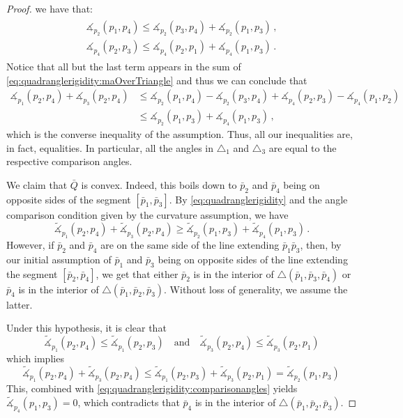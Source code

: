 \documentclass[11pt,reqno]{amsart}
\theoremstyle{definition}
\theoremstyle{definition}
\theoremstyle{plain}
\theoremstyle{remark}
\newcommand{\ma}{\measuredangle}
\newcommand{\bp}{\bar p}
\begin{document}
\begin{proof}
we have that:
\begin{align}\label{eq:quadranglerigidity:triIneqAng}
\begin{split}
\ma_{p_2}(p_1,p_4)\leq\ma_{p_2}(p_3,p_4)+\ma_{p_2}(p_1,p_3)\, ,\\
\ma_{p_4}(p_2,p_3)\leq\ma_{p_4}(p_2,p_1)+\ma_{p_4}(p_1,p_3) \, .
\end{split}
\end{align}
Notice that all but the last term appears in the sum of \eqref{eq:quadranglerigidity:maOverTriangle} and thus we can conclude that
\begin{align*}
\ma_{p_1}(p_2,p_4)\!+\!\ma_{p_3}(p_2,p_4)&\leq \ma_{p_2}(p_1,p_4)\!-\!\ma_{p_2}(p_3,p_4)\!+\!\ma_{p_4}(p_2,p_3)\!-\!\ma_{p_4}(p_1,p_2)\\
&\leq \ma_{p_2}(p_1,p_3)\!+\!\ma_{p_4}(p_1,p_3) \, ,
\end{align*}
which is the converse inequality of the assumption. Thus, all our inequalities are, in fact, equalities. In particular, all the angles in $\triangle_1$ and $\triangle_3$ are equal to the respective comparison angles.

We claim that $\bar{Q}$ is convex. Indeed, this boils down to $\bar{p}_2$ and $\bar{p}_4$ being on opposite sides of the segment $[\bar{p}_1, \bar{p}_3]$. 
By \eqref{eq:quadranglerigidity} and the angle comparison condition given by the curvature assumption, we have
\begin{equation}\label{eq:quadranglerigidity:comparisonangles}
\widetilde{\ma}_{p_1}(p_2,p_4) + \widetilde{\ma}_{p_3}(p_2,p_4) \geq \widetilde{\ma}_{p_2}(p_1,p_3) + \widetilde{\ma}_{p_4}(p_1,p_3) \, .
\end{equation}
However, if $\bar{p}_2$ and $\bar{p}_4$ are on the same side of the line extending $\bar{p}_1\bar{p}_3$, then, by our initial assumption of $\bp_1$ and $\bp_3$ being on opposite sides of the line extending the segment $[\bp_2,\bp_4]$, we get that either $\bar p_2$ is in the interior of $\triangle(\bar{p}_1,\bar{p}_3,\bar{p}_4)$ or $\bar{p}_4$ is in the interior of $\triangle(\bar{p}_1,\bar{p}_2,\bar{p}_3)$. Without loss of generality, we assume the latter. 



Under this hypothesis, it is clear that 
\[
\widetilde{\ma}_{p_1}(p_2,p_4) \leq \widetilde{\ma}_{p_1}(p_2,p_3) \quad \text{and} \quad \widetilde{\ma}_{p_3}(p_2,p_4) \leq \widetilde{\ma}_{p_3}(p_2,p_1) 
\]
which implies
\[
\widetilde{\ma}_{p_1}(p_2,p_4) + \widetilde{\ma}_{p_3}(p_2,p_4)  \leq \widetilde{\ma}_{p_1}(p_2,p_3) + \widetilde{\ma}_{p_3}(p_2,p_1)  = \widetilde{\ma}_{p_2}(p_1,p_3)\, 
\]
This, combined with \eqref{eq:quadranglerigidity:comparisonangles} yields 
$\widetilde{\ma}_{p_4}(p_1,p_3) = 0$, which contradicts that $\bar{p}_4$ is in the interior of $\triangle(\bar{p}_1,\bar{p}_2,\bar{p}_3)$.


\end{proof}
\end{document}
